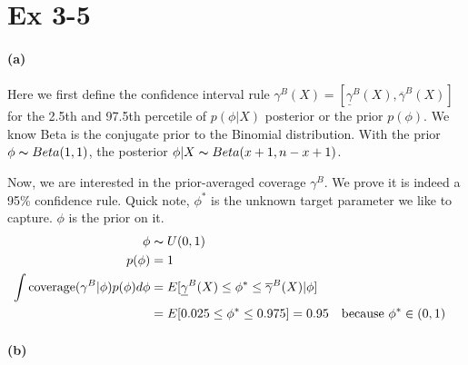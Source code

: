 \documentclass[11pt, letterpaper]{article}
\begin{document}
\newpage
\section{Ex 3-5}
\paragraph{(a)}
Here we first define the confidence interval rule $\gamma^B(X) = [\underline{\gamma}^B(X), \overline{\gamma}^B(X)]$ for the 2.5th and 97.5th percetile of $p(\phi|X)$ posterior or the prior $p(\phi)$. We know Beta is the conjugate prior to the Binomial distribution. With the prior $\phi \thicksim Beta(1, 1)$, the posterior $\phi|X \thicksim Beta(x + 1, n-x+1)$.

Now, we are interested in the prior-averaged coverage $\gamma^B$. We prove it is indeed a 95\% confidence rule. Quick note, $\phi^*$ is the unknown target parameter we like to capture. $\phi$ is the prior on it.
\begin{align*}
    \phi &\thicksim U(0, 1) \\
    p(\phi) &= 1 \\
    \int \text{coverage}(\gamma^B|\phi) p(\phi) d\phi &= E[\underline{\gamma}^B(X) \le \phi^* \le \overline{\gamma}^B(X)|\phi] \\
        &= E[0.025 \le \phi^* \le 0.975] = 0.95 && \text{because $\phi^* \in (0, 1)$}
\end{align*}

\paragraph{(b)}
\end{document}
